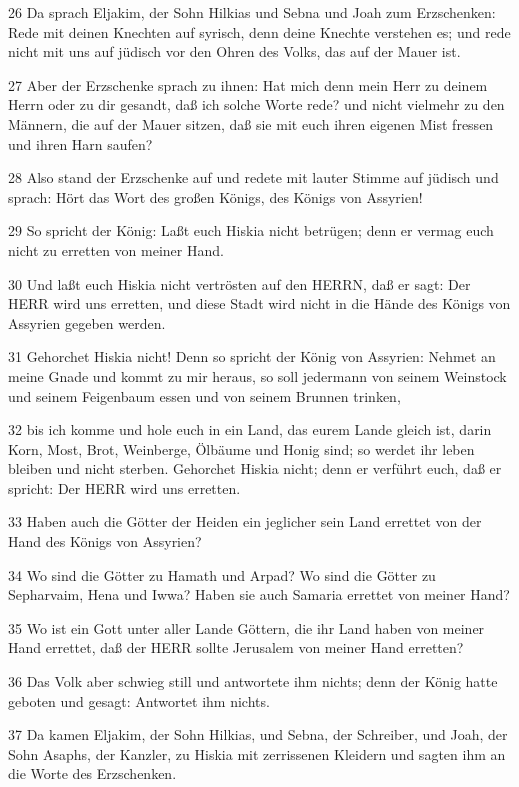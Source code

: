 \par 26 Da sprach Eljakim, der Sohn Hilkias und Sebna und Joah zum Erzschenken: Rede mit deinen Knechten auf syrisch, denn deine Knechte verstehen es; und rede nicht mit uns auf jüdisch vor den Ohren des Volks, das auf der Mauer ist.
\par 27 Aber der Erzschenke sprach zu ihnen: Hat mich denn mein Herr zu deinem Herrn oder zu dir gesandt, daß ich solche Worte rede? und nicht vielmehr zu den Männern, die auf der Mauer sitzen, daß sie mit euch ihren eigenen Mist fressen und ihren Harn saufen?
\par 28 Also stand der Erzschenke auf und redete mit lauter Stimme auf jüdisch und sprach: Hört das Wort des großen Königs, des Königs von Assyrien!
\par 29 So spricht der König: Laßt euch Hiskia nicht betrügen; denn er vermag euch nicht zu erretten von meiner Hand.
\par 30 Und laßt euch Hiskia nicht vertrösten auf den HERRN, daß er sagt: Der HERR wird uns erretten, und diese Stadt wird nicht in die Hände des Königs von Assyrien gegeben werden.
\par 31 Gehorchet Hiskia nicht! Denn so spricht der König von Assyrien: Nehmet an meine Gnade und kommt zu mir heraus, so soll jedermann von seinem Weinstock und seinem Feigenbaum essen und von seinem Brunnen trinken,
\par 32 bis ich komme und hole euch in ein Land, das eurem Lande gleich ist, darin Korn, Most, Brot, Weinberge, Ölbäume und Honig sind; so werdet ihr leben bleiben und nicht sterben. Gehorchet Hiskia nicht; denn er verführt euch, daß er spricht: Der HERR wird uns erretten.
\par 33 Haben auch die Götter der Heiden ein jeglicher sein Land errettet von der Hand des Königs von Assyrien?
\par 34 Wo sind die Götter zu Hamath und Arpad? Wo sind die Götter zu Sepharvaim, Hena und Iwwa? Haben sie auch Samaria errettet von meiner Hand?
\par 35 Wo ist ein Gott unter aller Lande Göttern, die ihr Land haben von meiner Hand errettet, daß der HERR sollte Jerusalem von meiner Hand erretten?
\par 36 Das Volk aber schwieg still und antwortete ihm nichts; denn der König hatte geboten und gesagt: Antwortet ihm nichts.
\par 37 Da kamen Eljakim, der Sohn Hilkias, und Sebna, der Schreiber, und Joah, der Sohn Asaphs, der Kanzler, zu Hiskia mit zerrissenen Kleidern und sagten ihm an die Worte des Erzschenken.

